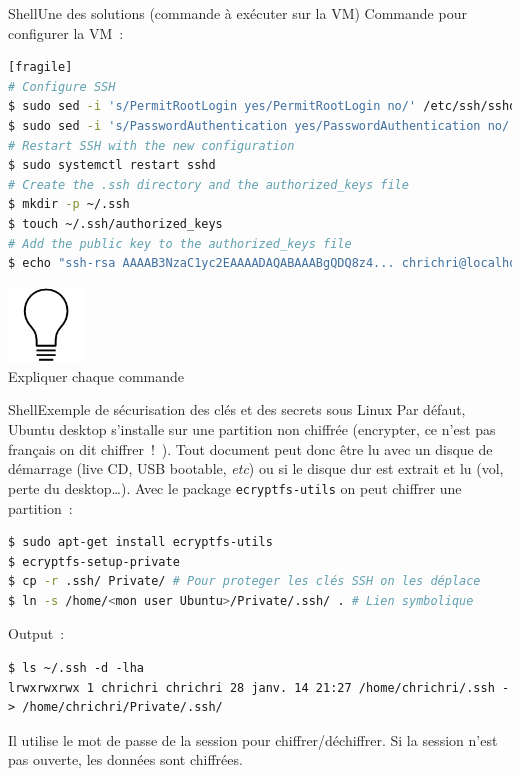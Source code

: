 \documentclass{beamer}
\begin{document}
    \begin{frame}[fragile]{Shell}{Une des solutions (commande à exécuter sur la VM)}
        Commande pour configurer la VM~:
        \begin{lstlisting}[language=bash][fragile]
# Configure SSH
$ sudo sed -i 's/PermitRootLogin yes/PermitRootLogin no/' /etc/ssh/sshd_config
$ sudo sed -i 's/PasswordAuthentication yes/PasswordAuthentication no/' /etc/ssh/sshd_config
# Restart SSH with the new configuration
$ sudo systemctl restart sshd
# Create the .ssh directory and the authorized_keys file
$ mkdir -p ~/.ssh
$ touch ~/.ssh/authorized_keys
# Add the public key to the authorized_keys file
$ echo "ssh-rsa AAAAB3NzaC1yc2EAAAADAQABAAABgQDQ8z4... chrichri@localhost" >> ~/.ssh/authorized_keys
        \end{lstlisting}
        \begin{center}
            \includegraphics[width=2cm]{image/bulb} \\ Expliquer chaque commande \\
        \end{center}
    \end{frame}

    \begin{frame}[fragile]{Shell}{Exemple de sécurisation des clés et des secrets sous Linux}
        Par défaut, Ubuntu desktop s’installe sur une partition non
        chiffrée (encrypter, ce n’est pas français on dit chiffrer~!~).
        Tout document peut donc être lu avec un disque de
        démarrage (live CD, USB bootable, \textit{etc}) ou si le disque dur
        est extrait et lu (vol, perte du desktop\ldots).
        \bigbreak
        Avec le package \lstinline{ecryptfs-utils} on peut chiffrer une partition~:
        \begin{lstlisting}[language=bash]
$ sudo apt-get install ecryptfs-utils
$ ecryptfs-setup-private
$ cp -r .ssh/ Private/ # Pour proteger les clés SSH on les déplace
$ ln -s /home/<mon user Ubuntu>/Private/.ssh/ . # Lien symbolique
        \end{lstlisting}
        Output~:
        \begin{lstlisting}
$ ls ~/.ssh -d -lha
lrwxrwxrwx 1 chrichri chrichri 28 janv. 14 21:27 /home/chrichri/.ssh -> /home/chrichri/Private/.ssh/
        \end{lstlisting}
        Il utilise le mot de passe de la session pour chiffrer/déchiffrer.
        Si la session n'est pas ouverte, les données sont chiffrées.
    \end{frame}
\end{document}
